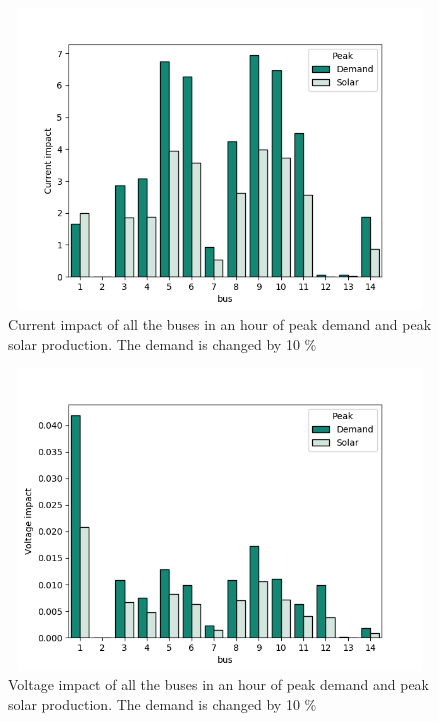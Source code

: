 \documentclass[class=book, crop=false, 11pt]{standalone}
\begin{document}
\begin{figure}[h]
    \center
\includegraphics[height=8cm, width=12cm]{figures/current_impact_demand_solar.png}
    \caption[size = 9]{Current impact of all the buses in an hour of peak demand and peak solar production. The demand is changed by 10 \%}
    \label{fig:discussion:current_impact_demand_solar}
\end{figure}

\begin{figure}[h]
    \center
\includegraphics[height=8cm, width=12cm]{figures/voltage_impact_demand_solar.png}
    \caption[size = 9]{Voltage impact of all the buses in an hour of peak demand and peak solar production. The demand is changed by 10 \%}
    \label{fig:discussion:voltage_impact_demand_solar}
\end{figure}
\end{document}
